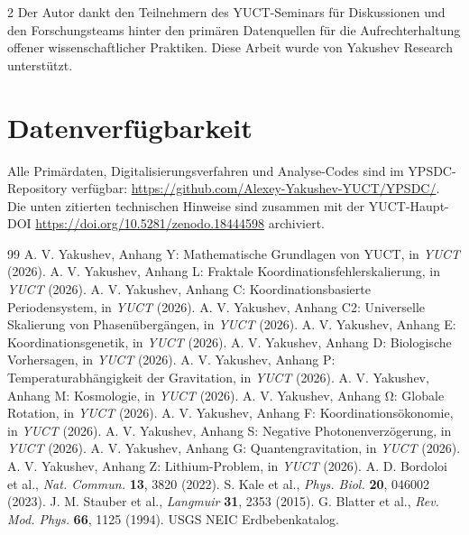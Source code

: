 \documentclass[11pt,a4paper]{article}
\begin{document}
\begin{multicols}{2}
		Der Autor dankt den Teilnehmern des YUCT-Seminars für Diskussionen und den Forschungsteams hinter den primären Datenquellen für die Aufrechterhaltung offener wissenschaftlicher Praktiken. Diese Arbeit wurde von Yakushev Research unterstützt.
		
		\section*{Datenverfügbarkeit}
		
		Alle Primärdaten, Digitalisierungsverfahren und Analyse-Codes sind im YPSDC-Repository verfügbar: \url{https://github.com/Alexey-Yakushev-YUCT/YPSDC/}. Die unten zitierten technischen Hinweise sind zusammen mit der YUCT-Haupt-DOI \url{https://doi.org/10.5281/zenodo.18444598} archiviert.
		
		\begin{thebibliography}{99}
			 A. V. Yakushev, Anhang Y: Mathematische Grundlagen von YUCT, in \emph{YUCT} (2026).
			 A. V. Yakushev, Anhang L: Fraktale Koordinationsfehlerskalierung, in \emph{YUCT} (2026).
			 A. V. Yakushev, Anhang C: Koordinationsbasierte Periodensystem, in \emph{YUCT} (2026).
			 A. V. Yakushev, Anhang C2: Universelle Skalierung von Phasenübergängen, in \emph{YUCT} (2026).
			 A. V. Yakushev, Anhang E: Koordinationsgenetik, in \emph{YUCT} (2026).
			 A. V. Yakushev, Anhang D: Biologische Vorhersagen, in \emph{YUCT} (2026).
			 A. V. Yakushev, Anhang P: Temperaturabhängigkeit der Gravitation, in \emph{YUCT} (2026).
			 A. V. Yakushev, Anhang M: Kosmologie, in \emph{YUCT} (2026).
			 A. V. Yakushev, Anhang Ω: Globale Rotation, in \emph{YUCT} (2026).
			 A. V. Yakushev, Anhang F: Koordinationsökonomie, in \emph{YUCT} (2026).
			 A. V. Yakushev, Anhang S: Negative Photonenverzögerung, in \emph{YUCT} (2026).
			 A. V. Yakushev, Anhang G: Quantengravitation, in \emph{YUCT} (2026).
			 A. V. Yakushev, Anhang Z: Lithium-Problem, in \emph{YUCT} (2026).
			 A. D. Bordoloi et al., \emph{Nat. Commun.} \textbf{13}, 3820 (2022).
			 S. Kale et al., \emph{Phys. Biol.} \textbf{20}, 046002 (2023).
			 J. M. Stauber et al., \emph{Langmuir} \textbf{31}, 2353 (2015).
			 G. Blatter et al., \emph{Rev. Mod. Phys.} \textbf{66}, 1125 (1994).
			 USGS NEIC Erdbebenkatalog.

\end{thebibliography}
\end{multicols}
\end{document}
